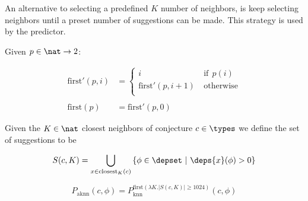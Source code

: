 
An alternative to selecting a predefined $K$ number of neighbors, is keep selecting neighbors until a preset number of suggestions can be made.
This strategy is used by the \knnadaptive predictor.

\begin{definition}
  Given $p \in \nat \rightarrow 2$:

  $$
    \begin{array}{ll}
      \text{first}'(p, i) & = \left\{
      \begin{array}{ll}
         i & ~\text{if}~~ p(i) \\
         \text{first}'(p, i+1) & ~\text{otherwise} \\
      \end{array}
      \right. \\
      \\
      \text{first}(p) & = \text{first}'(p, 0)
    \end{array}
  $$
\end{definition}

\begin{definition}
  Given the $K \in \nat$ closest neighbors of conjecture $c \in \types$ we define the set of suggestions to be

  $$
    S(c, K) = \bigcup_{x \in \text{closest}_K(c)} \left\{ \phi \in \depset ~|~ \deps{x}(\phi) > 0 \right\}
  $$
\end{definition}

\begin{definition}
  $$
    P_\text{aknn}(c, \phi) = P^{\text{first}(\lambda K . |S(c, K)| \geq 1024)}_\text{knn}(c, \phi)
  $$
\end{definition}
